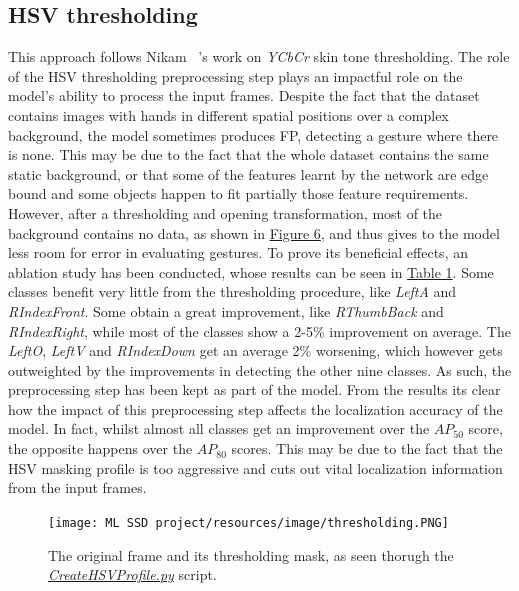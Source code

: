 \documentclass[10pt,twocolumn,letterpaper]{article}
\begin{document}
\subsection{HSV thresholding}
\label{HSV}
\begin{flushleft}
This approach follows Nikam \etal~\cite{7916786}'s work on \textit{YCbCr} skin tone thresholding.\linebreak
The role of the HSV thresholding preprocessing step plays an impactful role on the model's ability to process the input frames. Despite the fact that the dataset contains images with hands in different spatial positions over a complex background, the model sometimes produces FP, detecting a gesture where there is none. This may be due to the fact that the whole dataset contains the same static background, or that some of the features learnt by the network are edge bound and some objects happen to fit partially those feature requirements. However, after a thresholding and opening transformation, most of the background contains no data, as shown in \hyperref[figure6]{Figure 6}, and thus gives to the model less room for error in evaluating gestures. To prove its beneficial effects, an ablation study has been conducted, whose results can be seen in \hyperref[table1]{Table 1}.
Some classes benefit very little from the thresholding procedure, like \textit{LeftA} and \textit{RIndexFront}. Some obtain a great improvement, like \textit{RThumbBack} and \textit{RIndexRight}, while most of the classes show a 2-5\% improvement on average. The \textit{LeftO}, \textit{LeftV} and \textit{RIndexDown} get an average 2\% worsening, which however gets outweighted by the improvements in detecting the other nine classes. As such, the preprocessing step has been kept as part of the model.
From the results its clear how the impact of this preprocessing step affects the localization accuracy of the model. In fact, whilst almost all classes get an improvement over the $AP_{50}$ score, the opposite happens over the $AP_{80}$ scores. This may be due to the fact that the HSV masking profile is too aggressive and cuts out vital localization information from the input frames.

\begin{figure}[!h]
    \centering
    \texttt{[image: ML SSD project/resources/image/thresholding.PNG]}
    \caption{The original frame and its thresholding mask, as seen thorugh the \textit{\href{https://github.com/MarzioVallero/ML-Based-Blender-Gestural-Input-Interface/blob/master/CreateHSVProfile.py}{CreateHSVProfile.py}} script.}
\end{figure}
\label{figure6}

\end{flushleft}
\end{document}
